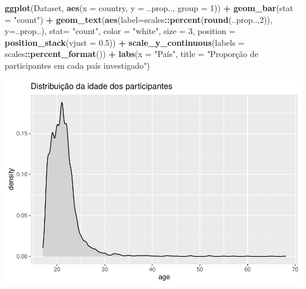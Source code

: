 \documentclass[
]{book}
\newenvironment{Shaded}{\begin{snugshade}}{\end{snugshade}}
\newcommand{\DataTypeTok}[1]{\textcolor[rgb]{0.13,0.29,0.53}{#1}}
\newcommand{\DecValTok}[1]{\textcolor[rgb]{0.00,0.00,0.81}{#1}}
\newcommand{\FloatTok}[1]{\textcolor[rgb]{0.00,0.00,0.81}{#1}}
\newcommand{\KeywordTok}[1]{\textcolor[rgb]{0.13,0.29,0.53}{\textbf{#1}}}
\newcommand{\NormalTok}[1]{#1}
\newcommand{\OperatorTok}[1]{\textcolor[rgb]{0.81,0.36,0.00}{\textbf{#1}}}
\newcommand{\StringTok}[1]{\textcolor[rgb]{0.31,0.60,0.02}{#1}}
\begin{document}
\begin{Shaded}
\begin{Highlighting}[]
\KeywordTok{ggplot}\NormalTok{(Dataset, }\KeywordTok{aes}\NormalTok{(}\DataTypeTok{x =}\NormalTok{ country, }\DataTypeTok{y =}\NormalTok{ ..prop.., }\DataTypeTok{group =} \DecValTok{1}\NormalTok{)) }\OperatorTok{+}\StringTok{ }
\StringTok{  }\KeywordTok{geom_bar}\NormalTok{(}\DataTypeTok{stat =} \StringTok{"count"}\NormalTok{) }\OperatorTok{+}
\StringTok{  }\KeywordTok{geom_text}\NormalTok{(}\KeywordTok{aes}\NormalTok{(}\DataTypeTok{label=}\NormalTok{scales}\OperatorTok{::}\KeywordTok{percent}\NormalTok{(}\KeywordTok{round}\NormalTok{(..prop..,}\DecValTok{2}\NormalTok{)), }
                \DataTypeTok{y=}\NormalTok{..prop..), }\DataTypeTok{stat=} \StringTok{"count"}\NormalTok{, }\DataTypeTok{color =} \StringTok{"white"}\NormalTok{, }\DataTypeTok{size =} \DecValTok{3}\NormalTok{, }\DataTypeTok{position =} \KeywordTok{position_stack}\NormalTok{(}\DataTypeTok{vjust =} \FloatTok{0.5}\NormalTok{)) }\OperatorTok{+}
\StringTok{  }\KeywordTok{scale_y_continuous}\NormalTok{(}\DataTypeTok{labels =}\NormalTok{ scales}\OperatorTok{::}\KeywordTok{percent_format}\NormalTok{()) }\OperatorTok{+}
\StringTok{  }\KeywordTok{labs}\NormalTok{(}\DataTypeTok{x =} \StringTok{"País"}\NormalTok{, }\DataTypeTok{title =} \StringTok{"Proporção de participantes em cada país investigado"}\NormalTok{)}
\end{Highlighting}
\end{Shaded}

\begin{center}\includegraphics{gitbook-demo_files/figure-latex/unnamed-chunk-17-1} \end{center}
\end{document}
